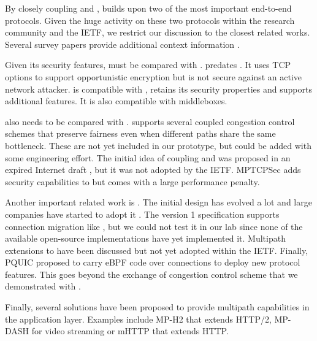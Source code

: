 
By closely coupling \tcp and \tls, \tcpls builds upon two of the most important
end-to-end protocols. Given the huge activity on these two protocols within the
research community and the IETF, we restrict our discussion to the closest
related works. Several survey papers provide additional context information
\cite{polese2019survey,li2016multipath,papastergiou2016ossifying}.

Given its security features, \tcpls must be compared with \tcpcrypt
\cite{bittau2010case,rfc8548}. \tcpcrypt predates . It uses TCP options
to support opportunistic encryption but is not secure against an active network
attacker. \tcpls is compatible with \tls, retains its security properties and supports
additional features. It is also compatible with \tcp middleboxes.

\tcpls also needs to be compared with \mptcp \cite{raiciu2012hard,rfc6824}.
\mptcp supports several coupled congestion control schemes
\cite{peng2014multipath,wischik2011design,khalili2013mptcp} that preserve
fairness even when different paths share the same bottleneck. These are not yet
included in our \tcpls prototype, but could be added with some engineering
effort. The initial idea of coupling \mptcp and \tls was proposed in an expired
Internet draft \cite{draft-paasch-mptcp-ssl-00}, but it was not adopted by the
IETF. MPTCPSec \cite{jadin2017securing} adds security capabilities to \mptcp but
comes with a large performance penalty.

Another important related work is \quic. The initial design
\cite{roskind2013quic} has evolved a lot and large companies have started to
adopt it \cite{langley2017quic,Joras_mvfst,marx2020same}. The \quic
version 1 specification \cite{draft-ietf-quic-transport} supports connection
migration like \tcpls, but we could not test it in our lab since none of the
available open-source implementations have yet implemented it. Multipath
extensions
\cite{viernickel2018multipath,de2017multipath,draft-deconinck-quic-multipath-06,draft-liu-multipath-quic-02}
to \quic have been discussed but not yet adopted within the IETF. Finally, PQUIC
\cite{de2019pluginizing} proposed to carry eBPF code over \quic connections to
deploy new protocol features. This goes beyond the exchange of congestion
control scheme that we demonstrated with \tcpls.

Finally, several solutions have been proposed to provide multipath capabilities
in the application layer. Examples include MP-H2 \cite{nikravesh2019mp} that
extends HTTP/2, MP-DASH \cite{han2016mp} for video streaming or mHTTP
\cite{kim2014multi} that extends HTTP.


